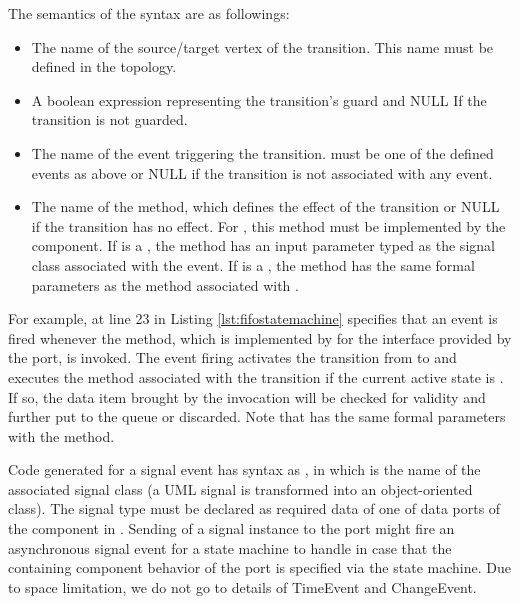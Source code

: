 The semantics of the syntax are as followings:
\begin{itemize}[\footnotesize]
	\itemsep0em
	\item {} The name of the source/target vertex of the transition. 
	This name must be defined in the topology.
	
	
	\item {} A boolean expression representing the transition's guard and NULL If the transition is not guarded.
	
	\item {} The name of the event triggering the transition. 
	 must be one of the defined events as above or NULL if the transition is not associated with any event.
	
	\item {} The name of the method, which defines the effect of the transition or NULL if the transition has no effect.
	For , this method must be implemented by the component.
	If  is a , the method has an input parameter typed as the signal class associated with the event.
	If  is a , the method has the same formal parameters as the method associated with .
\end{itemize}


For example,  at line 23 in Listing \ref{lst:fifostatemachine} specifies that an event is fired whenever the  method, which is implemented by  for the  interface provided by the  port, is invoked.
The event firing activates the transition from  to  and executes the  method associated with the transition if the current active state is .
If so, the data item brought by the invocation will be checked for validity and further put to the queue or discarded.
Note that  has the same formal parameters with the  method.

Code generated for a signal event has syntax as , in which  is the name of the associated signal class (a UML signal is transformed into an object-oriented class).
The signal type must be declared as required data of one of data ports of the component in .
Sending of a signal instance to the port might fire an asynchronous signal event for a state machine to handle in case that the containing component behavior of the port is specified via the state machine.
Due to space limitation, we do not go to details of TimeEvent and ChangeEvent.

